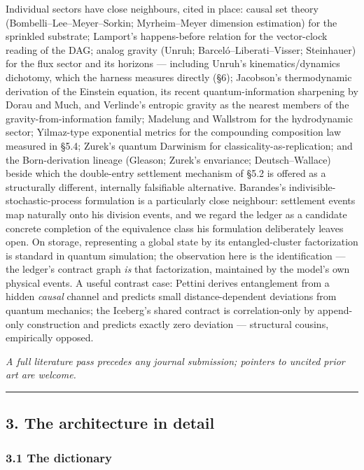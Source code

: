 \documentclass[
  11pt,
]{article}
\begin{document}
Individual sectors have close neighbours, cited in place: causal set
theory (Bombelli--Lee--Meyer--Sorkin; Myrheim--Meyer dimension
estimation) for the sprinkled substrate; Lamport's happens-before
relation for the vector-clock reading of the DAG; analog gravity (Unruh;
Barceló--Liberati--Visser; Steinhauer) for the flux sector and its
horizons --- including Unruh's kinematics/dynamics dichotomy, which the
harness measures directly (\S{}6); Jacobson's thermodynamic derivation of
the Einstein equation, its recent quantum-information sharpening by
Dorau and Much, and Verlinde's entropic gravity as the nearest members
of the gravity-from-information family; Madelung and Wallstrom for the
hydrodynamic sector; Yilmaz-type exponential metrics for the compounding
composition law measured in \S{}5.4; Zurek's quantum Darwinism for
classicality-as-replication; and the Born-derivation lineage (Gleason;
Zurek's envariance; Deutsch--Wallace) beside which the double-entry
settlement mechanism of \S{}5.2 is offered as a structurally different,
internally falsifiable alternative. Barandes's
indivisible-stochastic-process formulation is a particularly close
neighbour: settlement events map naturally onto his division events, and
we regard the ledger as a candidate concrete completion of the
equivalence class his formulation deliberately leaves open. On storage,
representing a global state by its entangled-cluster factorization is
standard in quantum simulation; the observation here is the
identification --- the ledger's contract graph \emph{is} that
factorization, maintained by the model's own physical events. A useful
contrast case: Pettini derives entanglement from a hidden \emph{causal}
channel and predicts small distance-dependent deviations from quantum
mechanics; the Iceberg's shared contract is correlation-only by
append-only construction and predicts exactly zero deviation ---
structural cousins, empirically opposed.

\emph{A full literature pass precedes any journal submission; pointers
to uncited prior art are welcome.}

\begin{center}\rule{0.5\linewidth}{0.5pt}\end{center}

\subsection{3. The architecture in
detail}\label{the-architecture-in-detail}

\subsubsection{3.1 The dictionary}\label{the-dictionary}
\end{document}
